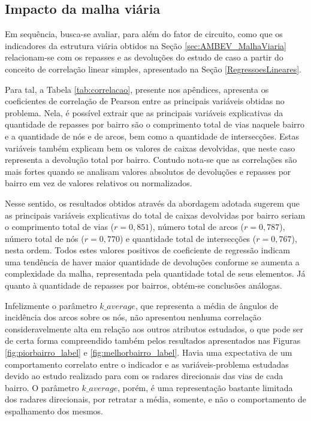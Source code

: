\subsection{Impacto da malha viária} \label{ImpactoMalhaViariaBebidas}

Em sequência, busca-se avaliar, para além do fator de circuito, como que os indicadores da estrutura viária obtidos na Seção \ref{sec:AMBEV_MalhaViaria} relacionam-se com os repasses e as devoluções do estudo de caso a partir do conceito de correlação linear simples, apresentado na Seção \ref{RegressoesLineares}.

Para tal, a Tabela \ref{tab:correlacao}, presente nos apêndices, apresenta os coeficientes de correlação de Pearson entre as principais variáveis obtidas no problema.
Nela, é possível extrair que as principais variáveis explicativas da quantidade de repasses por bairro são o comprimento total de vias naquele bairro e a quantidade de nós e de arcos, bem como a quantidade de intersecções.
Estas variáveis também explicam bem os valores de caixas devolvidas, que neste caso representa a devolução total por bairro.
Contudo nota-se que as correlações são mais fortes quando se analisam valores absolutos de devoluções e repasses por bairro em vez de valores relativos ou normalizados.

Nesse sentido, os resultados obtidos através da abordagem adotada sugerem que as principais variáveis explicativas do total de caixas devolvidas por bairro seriam o comprimento total de vias ($r=0,851$), número total de arcos ($r=0,787$), número total de nós ($r=0,770$) e quantidade total de intersecções ($r=0,767$), nesta ordem.
Todos estes valores positivos de coeficiente de regressão indicam uma tendência de haver maior quantidade de devoluções conforme se aumenta a complexidade da malha, representada pela quantidade total de seus elementos.
Já quanto à quantidade de repasses por bairros, obtém-se conclusões análogas.

Infelizmente o parâmetro $k\_average$, que representa a média de ângulos de incidência dos arcos sobre os nós, não apresentou nenhuma correlação consideravelmente alta em relação aos outros atributos estudados, o que pode ser de certa forma compreendido também pelos resultados apresentados nas Figuras \ref{fig:piorbairro_label} e \ref{fig:melhorbairro_label}. 
Havia uma expectativa de um comportamento correlato entre o indicador e as variáveis-problema estudadas devido ao estudo realizado para com os radares direcionais das vias de cada bairro. O parâmetro $k\_average$, porém, é uma representação bastante limitada dos radares direcionais, por retratar a média, somente, e não o comportamento de espalhamento dos mesmos.